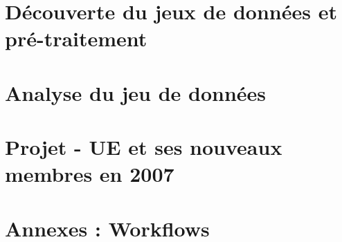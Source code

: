 \documentclass[a4paper]{article}
\begin{document}
\part{Découverte du jeux de données et pré-traitement}


   



  \newpage 
\part{Analyse du jeu de données}






\newpage
\part{Projet - UE et ses nouveaux membres en 2007}





\part{Annexes : Workflows}


 
\end{document}
